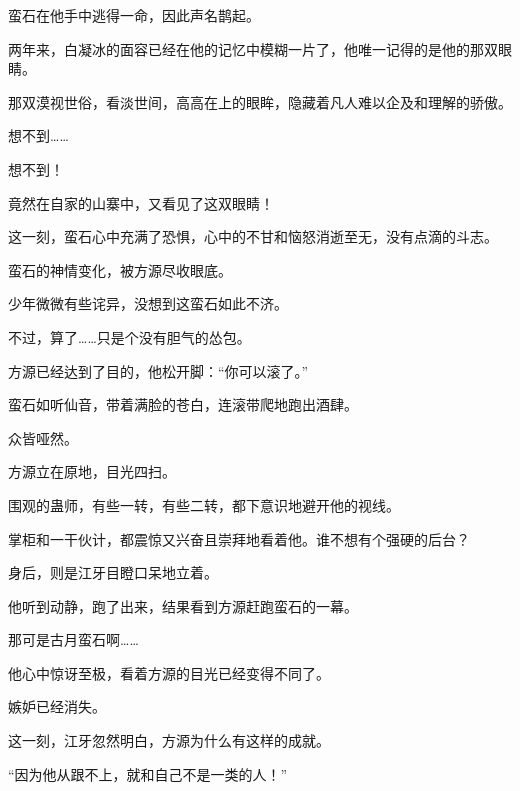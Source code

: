 \begin{this_body}
蛮石在他手中逃得一命，因此声名鹊起。

两年来，白凝冰的面容已经在他的记忆中模糊一片了，他唯一记得的是他的那双眼睛。

那双漠视世俗，看淡世间，高高在上的眼眸，隐藏着凡人难以企及和理解的骄傲。

想不到……

想不到！

竟然在自家的山寨中，又看见了这双眼睛！

这一刻，蛮石心中充满了恐惧，心中的不甘和恼怒消逝至无，没有点滴的斗志。

蛮石的神情变化，被方源尽收眼底。

少年微微有些诧异，没想到这蛮石如此不济。

不过，算了……只是个没有胆气的怂包。

方源已经达到了目的，他松开脚：“你可以滚了。”

蛮石如听仙音，带着满脸的苍白，连滚带爬地跑出酒肆。

众皆哑然。

方源立在原地，目光四扫。

围观的蛊师，有些一转，有些二转，都下意识地避开他的视线。

掌柜和一干伙计，都震惊又兴奋且崇拜地看着他。谁不想有个强硬的后台？

身后，则是江牙目瞪口呆地立着。

他听到动静，跑了出来，结果看到方源赶跑蛮石的一幕。

那可是古月蛮石啊……

他心中惊讶至极，看着方源的目光已经变得不同了。

嫉妒已经消失。

这一刻，江牙忽然明白，方源为什么有这样的成就。

“因为他从跟不上，就和自己不是一类的人！”

\end{this_body}


